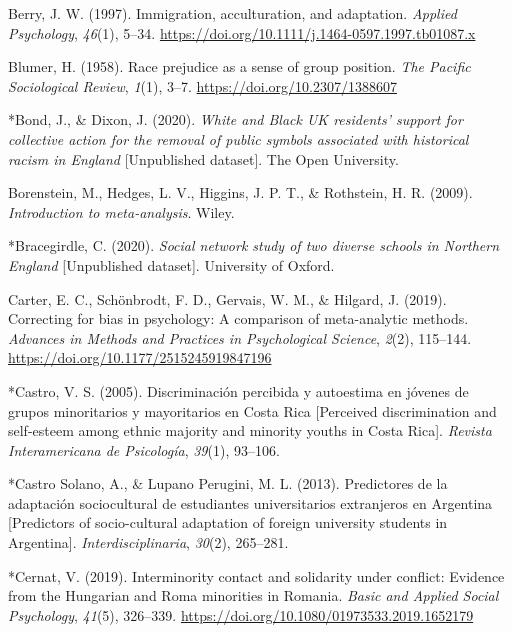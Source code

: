 \documentclass[12pt, letterpaper]{article}
\begin{document}
\leavevmode\hypertarget{ref-berry_immigration_1997}{}%
Berry, J. W. (1997). Immigration, acculturation, and adaptation.
\emph{Applied Psychology}, \emph{46}(1), 5--34.
\url{https://doi.org/10.1111/j.1464-0597.1997.tb01087.x}

\leavevmode\hypertarget{ref-blumer_race_1958}{}%
Blumer, H. (1958). Race prejudice as a sense of group position.
\emph{The Pacific Sociological Review}, \emph{1}(1), 3--7.
\url{https://doi.org/10.2307/1388607}

\leavevmode\hypertarget{ref-2397}{}%
*Bond, J., \& Dixon, J. (2020). \emph{White and Black UK residents'
support for collective action for the removal of public symbols
associated with historical racism in England} {[}Unpublished dataset{]}.
The Open University.

\leavevmode\hypertarget{ref-borenstein_introduction_2009}{}%
Borenstein, M., Hedges, L. V., Higgins, J. P. T., \& Rothstein, H. R.
(2009). \emph{Introduction to meta-analysis}. Wiley.

\leavevmode\hypertarget{ref-2398}{}%
*Bracegirdle, C. (2020). \emph{Social network study of two diverse
schools in Northern England} {[}Unpublished dataset{]}. University of
Oxford.

\leavevmode\hypertarget{ref-carter_correcting_2019}{}%
Carter, E. C., Schönbrodt, F. D., Gervais, W. M., \& Hilgard, J. (2019).
Correcting for bias in psychology: A comparison of meta-analytic
methods. \emph{Advances in Methods and Practices in Psychological
Science}, \emph{2}(2), 115--144.
\url{https://doi.org/10.1177/2515245919847196}

\leavevmode\hypertarget{ref-480}{}%
*Castro, V. S. (2005). Discriminación percibida y autoestima en jóvenes
de grupos minoritarios y mayoritarios en Costa Rica {[}Perceived
discrimination and self-esteem among ethnic majority and minority youths
in Costa Rica{]}. \emph{Revista Interamericana de Psicología},
\emph{39}(1), 93--106.

\leavevmode\hypertarget{ref-1914}{}%
*Castro Solano, A., \& Lupano Perugini, M. L. (2013). Predictores de la
adaptación sociocultural de estudiantes universitarios extranjeros en
Argentina {[}Predictors of socio-cultural adaptation of foreign
university students in Argentina{]}. \emph{Interdisciplinaria},
\emph{30}(2), 265--281.

\leavevmode\hypertarget{ref-3205}{}%
*Cernat, V. (2019). Interminority contact and solidarity under conflict:
Evidence from the Hungarian and Roma minorities in Romania. \emph{Basic
and Applied Social Psychology}, \emph{41}(5), 326--339.
\url{https://doi.org/10.1080/01973533.2019.1652179}
\end{document}
